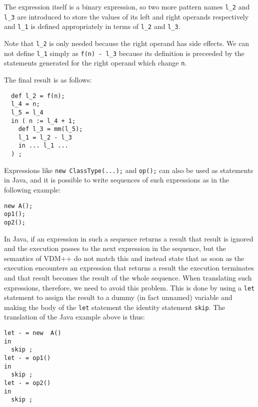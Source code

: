\documentclass[\pformat,12pt]{article}
\begin{document}
The expression itself is a binary expression, so two more pattern
names \texttt{l\_2} and \texttt{l\_3} are introduced to store the
values of its left and right operands respectively and \texttt{l\_1}
is defined appropriately in terms of \texttt{l\_2} and \texttt{l\_3}. 

Note that \texttt{l\_2} is only needed because
the right operand has side effects. We can not define \texttt{l\_1}
simply as \texttt{f(n) - l\_3} because its definition is preceeded
by the statements generated for the right operand which change \texttt{n}.

The final result is as follows:

\begin{small}
\begin{verbatim}
  def l_2 = f(n);
  l_4 = n;
  l_5 = l_4
  in ( n := l_4 + 1;
    def l_3 = mm(l_5);
    l_1 = l_2 - l_3
    in ... l_1 ...
  ) ;

\end{verbatim}
\end{small}


Expressions like \texttt{new ClassType(...);} and \texttt{op();} can
also be used as statements in Java, and it is possible to write
sequences of such expressions as in the following example:

\begin{small}
\begin{verbatim}
new A();
op1();
op2();
\end{verbatim}
\end{small}

In Java, if an expression in such a sequence returns a result that
result is ignored and the execution passes to the next expression in
the sequence, but the semantics of VDM++ do not match this and instead
state that as soon as the execution encounters an expression that
returns a result the execution terminates and that result becomes the
result of the whole sequence. When translating such expressions,
therefore, we need to avoid this problem. This is done by using a
\texttt{let} statement to assign the result to a dummy (in fact
unnamed) variable and making the body of the \texttt{let} statement
the identity statement \texttt{skip}. The translation of the Java
example above is thus:

\begin{small}
\begin{verbatim}
let - = new  A()
in 
  skip ;
let - = op1()
in 
  skip ;
let - = op2()
in 
  skip ;
\end{verbatim}
\end{small}
\end{document}

